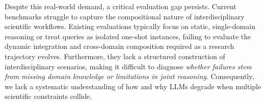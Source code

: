 Despite this real-world demand, a critical evaluation gap persists. Current benchmarks struggle to capture the compositional nature of interdisciplinary scientific workflows.
Existing evaluations typically focus on static, single-domain reasoning or treat queries as isolated one-shot instances, failing to evaluate the dynamic integration and cross-domain composition required as a research trajectory evolves.
Furthermore, they lack a structured construction of interdisciplinary scenarios, making it difficult to diagnose \emph{whether failures stem from missing domain knowledge or limitations in joint reasoning}.
Consequently, we lack a systematic understanding of how and why LLMs degrade when multiple scientific constraints collide.

